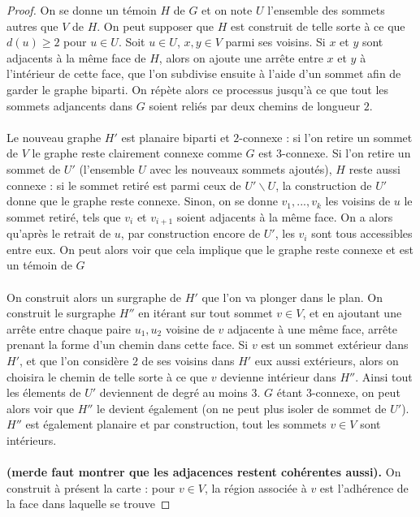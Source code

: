 \documentclass{scrartcl}
\begin{document}
\begin{flushleft}
\begin{proof}
    On se donne un témoin $H$ de $G$ et on note $U$ l'ensemble des sommets autres que $V$ de $H$. On peut supposer que $H$
    est construit de telle sorte à ce que $d(u) \geq 2$ pour $u \in U$. Soit $u \in U$, $x, y \in V$ parmi ses voisins.
    Si $x$ et $y$ sont adjacents à la même face de $H$, alors on ajoute une arrête entre $x$ et $y$ à l'intérieur de cette face,
    que l'on subdivise ensuite à l'aide d'un sommet afin de garder le graphe biparti. On répète alors
    ce processus jusqu'à ce que tout les sommets adjancents dans $G$ soient reliés par deux chemins de longueur $2$.
    \\~\\
    Le nouveau graphe $H'$ est planaire biparti et $2$-connexe : si l'on retire un sommet de $V$ le graphe reste clairement
    connexe comme $G$ est $3$-connexe. Si l'on retire un sommet de $U'$ (l'ensemble $U$ avec les nouveaux sommets ajoutés),
    $H$ reste aussi connexe :
    si le sommet retiré est parmi ceux de $U' \backslash U$, la construction de $U'$ donne que le graphe reste connexe. Sinon,
    on se donne $v_1, ..., v_k$ les voisins de $u$ le sommet retiré, tels que $v_i$ et $v_{i+1}$ soient adjacents à la
    même face. On a alors qu'après le retrait de $u$, par construction encore de $U'$, les $v_i$ sont tous accessibles
    entre eux. On peut alors voir que cela implique que le graphe reste connexe et est un témoin de $G$
    \\~\\
    On construit alors un surgraphe de $H'$ que l'on va plonger dans le plan. On construit le
    surgraphe $H''$ en itérant sur tout sommet $v \in V$, et en ajoutant une arrête entre chaque paire $u_1, u_2$
    voisine de $v$ adjacente à une même face, arrête prenant la forme d'un chemin dans cette face. Si $v$ est
    un sommet extérieur dans $H'$, et que l'on considère $2$ de ses voisins dans $H'$ eux aussi extérieurs,
    alors on choisira le chemin de telle sorte à ce que $v$ devienne intérieur dans $H''$.
    Ainsi tout les élements de $U'$ deviennent de degré au moins $3$. $G$ étant $3$-connexe, on peut alors voir que $H''$
    le devient également (on ne peut plus isoler de sommet de $U'$). $H''$ est également planaire et par construction,
    tout les sommets $v \in V$ sont intérieurs.
    \\~\\
    \textbf{(merde faut montrer que les adjacences restent cohérentes aussi).}
    On construit à présent la carte : pour $v \in V$, la région associée à $v$ est l'adhérence de la face dans laquelle se trouve

\end{proof}
\end{flushleft}
\end{document}

